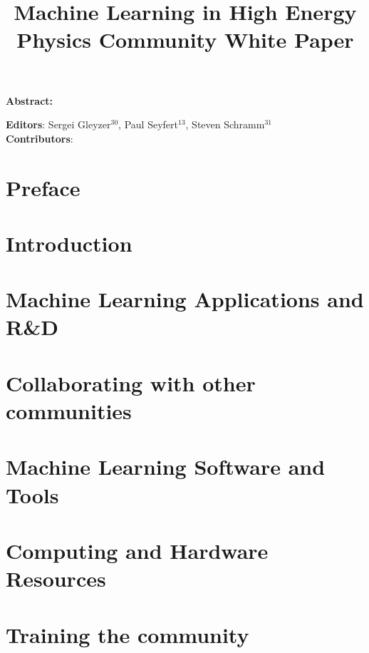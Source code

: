 \documentclass{article}
\begin{document}
\title{Machine Learning in High Energy Physics Community White Paper}

\maketitle

\setlength\parindent{0pt}
\textbf{Abstract:}

\vskip 1cm
\textbf{Editors}: Sergei Gleyzer$^{30}$, Paul Seyfert$^{13}$, Steven Schramm$^{31}$\\
\newline
\textbf{Contributors}:


\tableofcontents
\clearpage

\section{Preface}
\label{sec:preface}


\section{Introduction}
\label{sec:introduction}


\section{Machine Learning Applications and R\&D}
\label{sec:applications}


\section{Collaborating with other communities}
\label{sec:collaboration}


\section{Machine Learning Software and Tools}
\label{sec:software}


\section{Computing and Hardware Resources}
\label{sec:resources}


\section{Training the community}
\label{sec:training}

\end{document}
